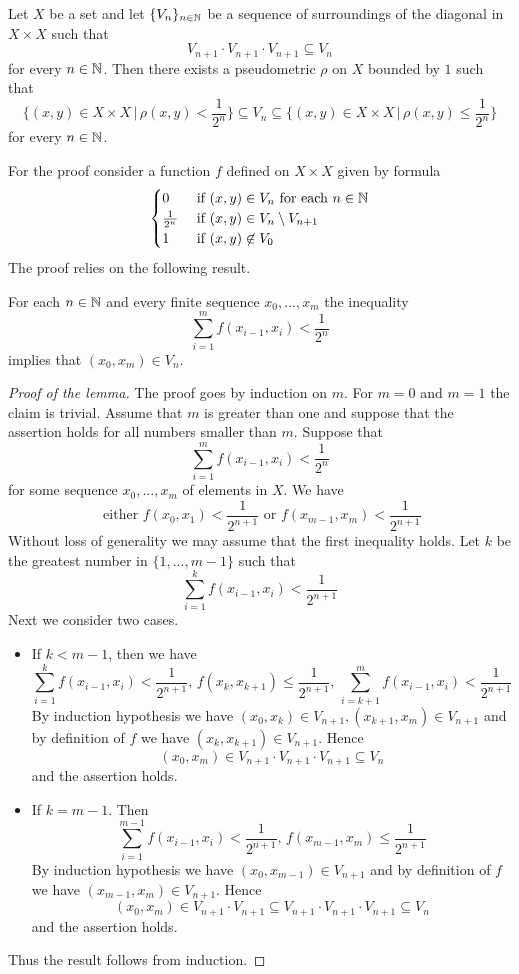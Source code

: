\begin{theorem}\label{theorem:Weils_theorem_on_pseudometrics}
Let $X$ be a set and let $\{V_n\}_{n\in {\mathbb N}}$ be a sequence of surroundings of the diagonal in $X\times X$ such that
$$V_{n+1}\cdot V_{n+1}\cdot V_{n+1} \subseteq V_n$$
for every $n\in {\mathbb N}$. Then there exists a pseudometric $\rho$ on $X$ bounded by $1$ such that
$$\bigg\{(x,y)\in X\times X\,\bigg|\,\rho(x,y)<\frac{1}{2^n}\bigg\} \subseteq V_n \subseteq \bigg\{(x,y)\in X\times X\,\bigg|\,\rho(x,y) \leq \frac{1}{2^n}\bigg\}$$
for every $n\in {\mathbb N}$.
\end{theorem}
\noindent
For the proof consider a function $f$ defined on $X\times X$ given by formula 
$$\begin{cases}
0 & \mbox{ if }(x,y)\in V_n\mbox{ for each }n\in {\mathbb N}\\
\frac{1}{2^n} & \mbox{ if }(x,y)\in V_n\setminus V_{n+1}\\
1 & \mbox{ if }(x,y)\not \in V_0
\end{cases}$$
The proof relies on the following result. 

\begin{lemma}\label{lemma:inclusion_of_surroundings_for_pseudometric}
For each $n \in {\mathbb N}$ and every finite sequence $x_0,...,x_m$ the inequality
$$\sum_{i=1}^mf(x_{i-1},x_i) < \frac{1}{2^n}$$
implies that $(x_0,x_m) \in V_n$.
\end{lemma}
\begin{proof}[Proof of the lemma]
The proof goes by induction on $m$. For $m = 0$ and $m = 1$ the claim is trivial. Assume that $m$ is greater than one and suppose that the assertion holds for all numbers smaller than $m$. Suppose that
$$\sum_{i=1}^mf(x_{i-1},x_i) < \frac{1}{2^n}$$
for some sequence $x_0,...,x_m$ of elements in $X$. We have
$$\mbox{ either }f(x_0,x_1) < \frac{1}{2^{n+1}}\mbox{ or }f(x_{m-1},x_m) < \frac{1}{2^{n+1}}$$
Without loss of generality we may assume that the first inequality holds. Let $k$ be the greatest number in $\{1,...,m-1\}$ such that
$$\sum_{i=1}^kf(x_{i-1},x_i) < \frac{1}{2^{n+1}}$$
Next we consider two cases.
\begin{itemize}
\item If $k < m-1$, then we have
$$\sum_{i=1}^{k}f(x_{i-1},x_i) < \frac{1}{2^{n+1}},\,f(x_k,x_{k+1}) \leq \frac{1}{2^{n+1}},\,\sum_{i=k+1}^mf(x_{i-1},x_i) < \frac{1}{2^{n+1}}$$
By induction hypothesis we have $(x_0,x_k)\in V_{n+1},(x_{k+1},x_m)\in V_{n+1}$ and by definition of $f$ we have $(x_k,x_{k+1})\in V_{n+1}$. Hence
$$(x_0,x_m) \in V_{n+1}\cdot V_{n+1}\cdot V_{n+1}\subseteq V_n$$
and the assertion holds.
\item If $k = m-1$. Then 
$$\sum_{i=1}^{m-1}f(x_{i-1},x_i) < \frac{1}{2^{n+1}},\,f(x_{m-1},x_m)\leq \frac{1}{2^{n+1}}$$
By induction hypothesis we have $(x_0,x_{m-1})\in V_{n+1}$ and by definition of $f$ we have $(x_{m-1},x_{m})\in V_{n+1}$. Hence
$$(x_0,x_{m}) \in V_{n+1}\cdot V_{n+1} \subseteq V_{n+1}\cdot V_{n+1}\cdot V_{n+1} \subseteq V_n$$
and the assertion holds.
\end{itemize}
Thus the result follows from induction.
\end{proof}

